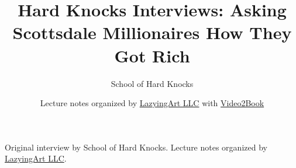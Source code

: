\documentclass[11pt,oneside]{book}
\begin{document}
\frontmatter
\title{Hard Knocks Interviews: Asking Scottsdale Millionaires How They Got Rich}
\author{School of Hard Knocks}
\date{Lecture notes organized by \href{https://lazying.art}{LazyingArt LLC} with \href{https://github.com/lachlanchen/Video2Book}{Video2Book}}
\maketitle
\begin{center}
\small Original interview by School of Hard Knocks. Lecture notes organized by \href{https://lazying.art}{LazyingArt LLC}.
\end{center}
\clearpage
\mainmatter

\end{document}
